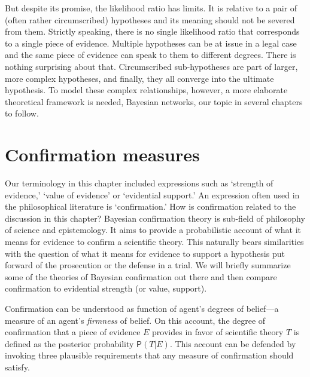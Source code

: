 \documentclass[
  10pt,
  dvipsnames,enabledeprecatedfontcommands]{scrartcl}
\newcommand{\pr}[1]{\mathsf{P}(#1)}
\begin{document}
But despite its promise, the likelihood ratio has limits. It is relative
to a pair of (often rather circumscribed) hypotheses and its meaning
should not be severed from them. Strictly speaking, there is no single
likelihood ratio that corresponds to a single piece of evidence.
Multiple hypotheses can be at issue in a legal case and the same piece
of evidence can speak to them to different degrees. There is nothing
surprising about that. Circumscribed sub-hypotheses are part of larger,
more complex hypotheses, and finally, they all converge into the
ultimate hypothesis. To model these complex relationships, however, a
more elaborate theoretical framework is needed, Bayesian networks, our
topic in several chapters to follow.

\appendix


\section{ Confirmation measures \label{sec:confirmation}}

Our terminology in this chapter included expressions such as `strength
of evidence,' `value of evidence' or `evidential support.' An expression
often used in the philosophical literature is `confirmation.' How is
confirmation related to the discussion in this chapter? Bayesian
confirmation theory is sub-field of philosophy of science and
epistemology. It aims to provide a probabilistic account of what it
means for evidence to confirm a scientific theory. This naturally bears
similarities with the question of what it means for evidence to support
a hypothesis put forward of the prosecution or the defense in a trial.
We will briefly summarize some of the theories of Bayesian confirmation
out there and then compare confirmation to evidential strength (or
value, support).

Confirmation can be understood as function of agent's degrees of
belief---a measure of an agent's \textit{firmness} of belief. On this
account, the degree of confirmation that a piece of evidence \(E\)
provides in favor of scientific theory \(T\) is defined as the posterior
probability \(\pr{T \vert E}\). This account can be defended by invoking
three plausible requirements that any measure of confirmation should
satisfy.
\end{document}
